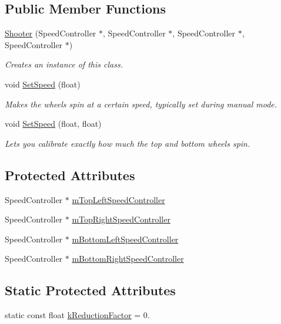 \subsection*{\-Public \-Member \-Functions}
\begin{DoxyCompactItemize}
\item 
\hyperlink{class_shooter_a529a6d247130ef0b3016f74faf402e2d}{\-Shooter} (\-Speed\-Controller $\ast$, \-Speed\-Controller $\ast$, \-Speed\-Controller $\ast$, \-Speed\-Controller $\ast$)
\begin{DoxyCompactList}\small\item\em \-Creates an instance of this class. \end{DoxyCompactList}\item 
void \hyperlink{class_shooter_a05fdd64fa0a3eaca039a36269c47fe7c}{\-Set\-Speed} (float)
\begin{DoxyCompactList}\small\item\em \-Makes the wheels spin at a certain speed, typically set during manual mode. \end{DoxyCompactList}\item 
void \hyperlink{class_shooter_ad2585dcdf4594f7ca7582a6c94699e67}{\-Set\-Speed} (float, float)
\begin{DoxyCompactList}\small\item\em \-Lets you calibrate exactly how much the top and bottom wheels spin. \end{DoxyCompactList}\end{DoxyCompactItemize}
\subsection*{\-Protected \-Attributes}
\begin{DoxyCompactItemize}
\item 
\-Speed\-Controller $\ast$ \hyperlink{class_shooter_a88b8889b38ca1b0da9d49da67305a8d0}{m\-Top\-Left\-Speed\-Controller}
\item 
\-Speed\-Controller $\ast$ \hyperlink{class_shooter_a2fbf3fc001d31b3c360624b36894c47d}{m\-Top\-Right\-Speed\-Controller}
\item 
\-Speed\-Controller $\ast$ \hyperlink{class_shooter_a3df532a45e73b964c026ab634764bd91}{m\-Bottom\-Left\-Speed\-Controller}
\item 
\-Speed\-Controller $\ast$ \hyperlink{class_shooter_aa41cfaf5fcf23f80ea777ad594b1bd86}{m\-Bottom\-Right\-Speed\-Controller}
\end{DoxyCompactItemize}
\subsection*{\-Static \-Protected \-Attributes}
\begin{DoxyCompactItemize}
\item 
static const float \hyperlink{class_shooter_a744bf16013f80de1e0c60136b4b51139}{k\-Reduction\-Factor} = 0.
\end{DoxyCompactItemize}



